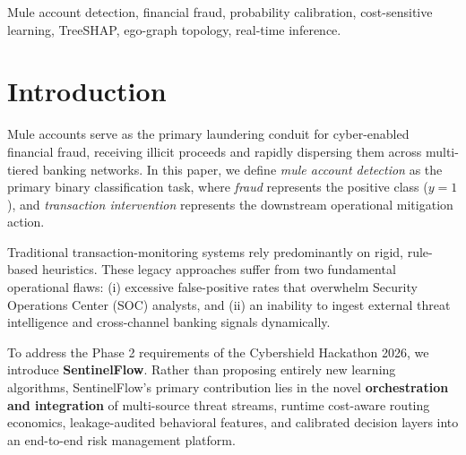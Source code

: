 \documentclass[conference]{IEEEtran}
\begin{document}
\begin{IEEEkeywords}
Mule account detection, financial fraud, probability calibration, cost-sensitive learning, TreeSHAP, ego-graph topology, real-time inference.
\end{IEEEkeywords}

\section{Introduction}
Mule accounts serve as the primary laundering conduit for cyber-enabled financial fraud, receiving illicit proceeds and rapidly dispersing them across multi-tiered banking networks. In this paper, we define \textit{mule account detection} as the primary binary classification task, where \textit{fraud} represents the positive class ($y = 1$), and \textit{transaction intervention} represents the downstream operational mitigation action.

Traditional transaction-monitoring systems rely predominantly on rigid, rule-based heuristics. These legacy approaches suffer from two fundamental operational flaws: (i) excessive false-positive rates that overwhelm Security Operations Center (SOC) analysts, and (ii) an inability to ingest external threat intelligence and cross-channel banking signals dynamically.

To address the Phase 2 requirements of the Cybershield Hackathon 2026, we introduce \textbf{SentinelFlow}. Rather than proposing entirely new learning algorithms, SentinelFlow’s primary contribution lies in the novel \textbf{orchestration and integration} of multi-source threat streams, runtime cost-aware routing economics, leakage-audited behavioral features, and calibrated decision layers into an end-to-end risk management platform.
\end{document}
